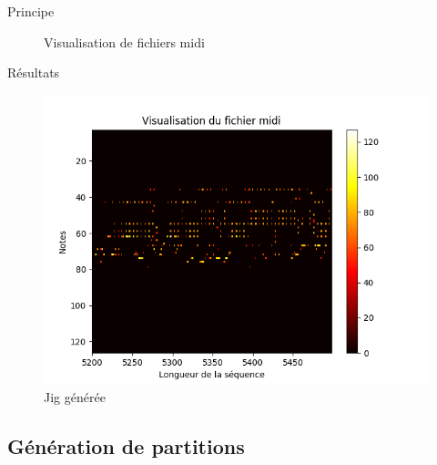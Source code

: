\documentclass{beamer}
\begin{document}
\begin{frame}{Principe}
\begin{figure}[!tbp]
  \centering
  \hfill
  \caption{Visualisation de fichiers midi}
\end{figure}
\end{frame}

\begin{frame}{Résultats}

\begin{figure}
\begin{center}
\includegraphics[width=0.5\linewidth]{images/jig_generated_38800.png}
\caption{Jig générée}
\end{center}
\end{figure}
\end{frame}

\subsection{Génération de partitions}
\end{document}
